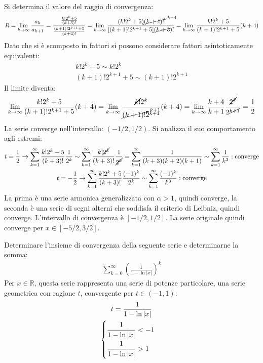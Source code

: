 \documentclass{article}
\numberwithin{equation}{subsection}
\begin{document}
Si determina il valore del raggio di convergenza:
\begin{gather*}
    R=\displaystyle\lim_{k\to\infty}\frac{a_k}{a_{k+1}}=\frac{\frac{k!2^k+5}{(k+3)!}}{\frac{(k+1)!2^{k+1}+5}{(k+4)!}}=
    \lim_{k\to\infty}\frac{(k!2^k+5)\cancelto{k+4}{(k+4)!}}{[(k+1)!2^{k+1}+5]\cancel{(k+3)!}}=
    \lim_{k\to\infty}\frac{k!2^k+5}{(k+1)!2^{k+1}+5}(k+4)
\end{gather*}
Dato che si è scomposto in fattori si possono considerare fattori asintoticamente equivalenti:
\begin{gather*}
    k!2^k+5\sim k!2^k\\
    (k+1)!2^{k+1}+5\sim(k+1)!2^{k+1}
\end{gather*}
Il limite diventa:
\begin{gather*}
    \lim_{k\to\infty}\frac{k!2^k+5}{(k+1)!2^{k+1}+5}(k+4)=
    \lim_{k\to\infty}\frac{\cancel{k!}2^k}{\cancelto{k+1}{(k+1)!}2^{k+1}}(k+4)=
    \lim_{k\to\infty}\frac{k+4}{k+1}\frac{\cancel{2^k}}{2^{\cancel{k+1}}}=\frac{1}{2}    
\end{gather*}
La serie converge nell'intervallo: $(-1/2, 1/2)$. Si analizza il suo comportamento agli estremi:
\begin{gather*}
    \displaystyle t=\frac{1}{2}\rightarrow\displaystyle\sum_{k=1}^\infty\frac{k!2^k+5}{(k+3)!}\frac{1}{2^k}\sim
    \displaystyle\sum_{k=1}^\infty\frac{k!\cancel{2^k}}{(k+3)!}\frac{1}{\cancel{2^k}}=
    \sum_{k=1}^\infty\frac{1}{(k+3)(k+2)(k+1)}\sim\sum_{k=1}^\infty\frac{1}{k^3}:\text{converge}\\
    \displaystyle t=-\frac{1}{2}\rightarrow\displaystyle\sum_{k=1}^\infty\frac{k!2^k+5}{(k+3)!}\frac{(-1)^k}{2^k}\sim\sum_{k=1}^\infty\frac{(-1)^k}{k^3}:\text{converge}
\end{gather*}
La prima è una serie armonica generalizzata con $\alpha>1$, quindi converge, la seconda è una serie di segni alterni che soddisfa il criterio di Leibniz, quindi converge. L'intervallo di convergenza è $[-1/2, 1/2]$. La serie originale quindi converge per $x\in[-5/2, 3/2]$. 


Determinare l'insieme di convergenza della seguente serie e determinarne la somma:
\begin{gather*}
    \displaystyle\sum_{k=0}^\infty\left(\frac{1}{1-\ln|x|}\right)^k
\end{gather*}
Per $x\in\mathbb{R}$, questa serie rappresenta una serie di potenze particolare, una serie geometrica con ragione $t$, convergente per $t\in(-1,1)$:
\begin{gather*}
    t=\displaystyle\frac{1}{1-\ln|x|}\\
    \begin{cases}
        \displaystyle\frac{\strut 1}{\strut 1-\ln|x|}< -1\\
        \displaystyle\frac{\strut 1}{\strut 1-\ln|x|}> 1
    \end{cases}
\end{gather*}
    
\end{document}

